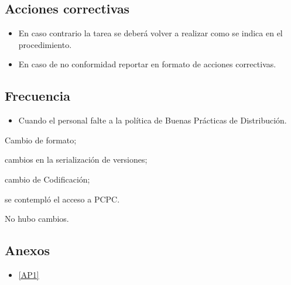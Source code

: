\subsection{Acciones correctivas}

\begin{itemize}
	\item En caso contrario la tarea se deberá volver a realizar como se indica en el procedimiento.
	\item En caso de no conformidad reportar en formato de acciones correctivas.
\end{itemize}

\subsection{Frecuencia}

\begin{itemize}
	\item Cuando el personal falte a la política de Buenas Prácticas de Distribución.
\end{itemize}

\begin{changelog}[simple, sectioncmd=\subsection*]
	\begin{version}[v=2.1, date=2023-01, author=Pablo E. Alanis]
			\item Cambio de formato;
			\item cambios en la serialización de versiones;
			\item cambio de Codificación;
			\item se contempló el acceso a PCPC.
	\end{version}

	\begin{version}[v=1.6, date=2022-05, author=Alonso M.]
		\item No hubo cambios.
	\end{version}

\end{changelog}

\subsection*{Anexos}

\begin{itemize}
	\item \cref{AP1}
\end{itemize}